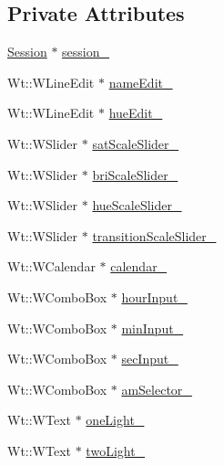 \subsection*{Private Attributes}
\begin{DoxyCompactItemize}
\item 
\hyperlink{classSession}{Session} $\ast$ \hyperlink{classSingleSchedulerControlWidget_a4cd226273646c8c761bb4762d5d561f3}{session\+\_\+}
\item 
Wt\+::\+W\+Line\+Edit $\ast$ \hyperlink{classSingleSchedulerControlWidget_adea2cd6431251b3e725a2e71ea53e98e}{name\+Edit\+\_\+}
\item 
Wt\+::\+W\+Line\+Edit $\ast$ \hyperlink{classSingleSchedulerControlWidget_ac184a13b1ff7561a7e2e5f790dc42bd3}{hue\+Edit\+\_\+}
\item 
Wt\+::\+W\+Slider $\ast$ \hyperlink{classSingleSchedulerControlWidget_a777b6c22a218902cb4410c6019aeb485}{sat\+Scale\+Slider\+\_\+}
\item 
Wt\+::\+W\+Slider $\ast$ \hyperlink{classSingleSchedulerControlWidget_a06c98bc002e49f45efd7180004884d8a}{bri\+Scale\+Slider\+\_\+}
\item 
Wt\+::\+W\+Slider $\ast$ \hyperlink{classSingleSchedulerControlWidget_af8f29e2d94ac91c19f7b44ac947f7f7d}{hue\+Scale\+Slider\+\_\+}
\item 
Wt\+::\+W\+Slider $\ast$ \hyperlink{classSingleSchedulerControlWidget_a5d56e0945847bd44dc494842b7ac8c58}{transition\+Scale\+Slider\+\_\+}
\item 
Wt\+::\+W\+Calendar $\ast$ \hyperlink{classSingleSchedulerControlWidget_ab6d7d409c6b686e460904b7c250824fd}{calendar\+\_\+}
\item 
Wt\+::\+W\+Combo\+Box $\ast$ \hyperlink{classSingleSchedulerControlWidget_a058831973716290b1ca72bb40d3cc4eb}{hour\+Input\+\_\+}
\item 
Wt\+::\+W\+Combo\+Box $\ast$ \hyperlink{classSingleSchedulerControlWidget_aba279034b626322922706c0ce95468c6}{min\+Input\+\_\+}
\item 
Wt\+::\+W\+Combo\+Box $\ast$ \hyperlink{classSingleSchedulerControlWidget_ac469a523613e142f84735b39d2ebc178}{sec\+Input\+\_\+}
\item 
Wt\+::\+W\+Combo\+Box $\ast$ \hyperlink{classSingleSchedulerControlWidget_a29f94e86583ee3ec6b509a7336772e3e}{am\+Selector\+\_\+}
\item 
Wt\+::\+W\+Text $\ast$ \hyperlink{classSingleSchedulerControlWidget_acfe14aa1c8dc0058376716cefc746dd9}{one\+Light\+\_\+}
\item 
Wt\+::\+W\+Text $\ast$ \hyperlink{classSingleSchedulerControlWidget_a37a5c0996f517813a1b0ffdcaf67108b}{two\+Light\+\_\+}

\end{DoxyCompactItemize}
